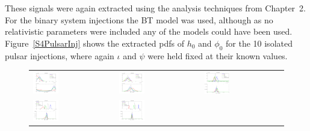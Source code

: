 These signals were again extracted using the analysis techniques from Chapter~2. For the binary
system injections the BT model was used, although as no relativistic parameters were included any
of the models could have been used. Figure~\ref{S4PulsarInj} shows the extracted pdfs of $h_0$ and
$\phi_0$ for the 10 isolated pulsar injections, where again $\iota$ and $\psi$ were held fixed at
their known values.
\begin{figure}[!htbp]
\begin{tabular}{l l l}
\includegraphics[width=0.33\textwidth]{figs/S4PULSAR0} &
\includegraphics[width=0.33\textwidth]{figs/S4PULSAR1} &
\includegraphics[width=0.33\textwidth]{figs/S4PULSAR2} \\
\includegraphics[width=0.33\textwidth]{figs/S4PULSAR3} &
\includegraphics[width=0.33\textwidth]{figs/S4PULSAR4} &

\end{tabular}
\end{figure}
